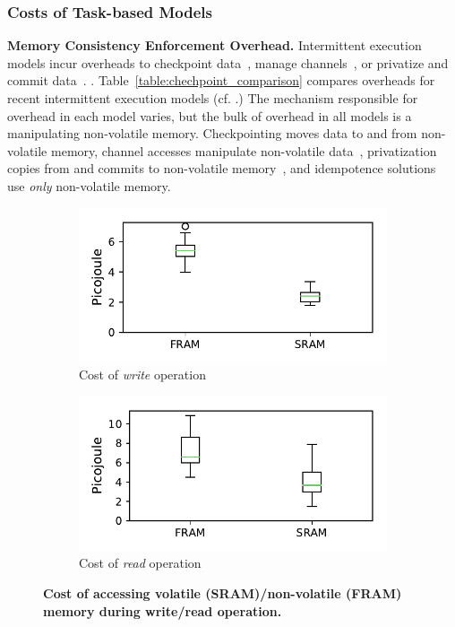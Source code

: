 \subsubsection{Costs of Task-based Models}



\textbf{Memory Consistency Enforcement Overhead.} Intermittent execution models incur overheads to checkpoint data~\cite{dino,ratchet,quickrecall,mementos}, manage channels~\cite{chain}, or privatize and commit data~\cite{alpaca}.  . Table~\ref{table:chechpoint_comparison} compares overheads for recent intermittent execution models (cf. \cite[Sec. 2.4]{alpaca}.) The mechanism responsible for overhead in each model varies, but the bulk of overhead in all models is a manipulating non-volatile memory. Checkpointing moves data to and from non-volatile memory, channel accesses manipulate non-volatile data~\cite{chain}, privatization copies from and commits to non-volatile memory~\cite{alpaca}, and idempotence solutions~\cite{ratchet} use {\em only} non-volatile memory.  

\begin{figure}
\begin{subfigure}[t]{.49\columnwidth}
	\centering \includegraphics[width=\columnwidth]{figures/fram_write}
	\caption{Cost of \emph{write} operation}
\end{subfigure}%
\begin{subfigure}[t]{.49\columnwidth}
	\centering \includegraphics[width=\columnwidth]{figures/fram_read}
	\caption{Cost of \emph{read} operation}
\end{subfigure}
	\caption{\textbf{Cost of accessing volatile (SRAM)/non-volatile (FRAM) memory during write/read operation.}}\label{fig:framEnergy}
\end{figure}

